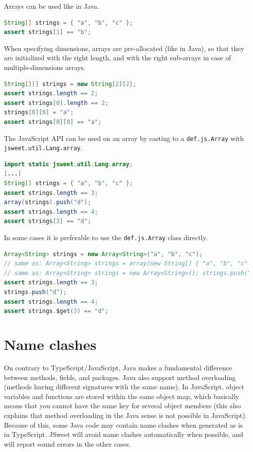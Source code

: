 \documentclass[a4paper]{report}
\begin{document}
Arrays can be used like in Java. 

\begin{lstlisting}[language=Java]
String[] strings = { "a", "b", "c" };
assert strings[1] == "b";
\end{lstlisting}

When specifying dimensions, arrays are pre-allocated (like in Java), so that they are initialized with the right length, and with the right sub-arrays in case of multiple-dimensions arrays.

\begin{lstlisting}[language=Java]
String[][] strings = new String[2][2];
assert strings.length == 2;
assert strings[0].length == 2;
strings[0][0] = "a";
assert strings[0][0] == "a";
\end{lstlisting}

The JavaScript API can be used on an array by casting to a \texttt{def.\-js.\-Array} with \texttt{jsweet.\-util.\-Lang.\-array}.

\begin{lstlisting}[language=Java]
import static jsweet.util.Lang.array;
[...]
String[] strings = { "a", "b", "c" };
assert strings.length == 3;
array(strings).push("d");
assert strings.length == 4;
assert strings[3] == "d";
\end{lstlisting}

In some cases it is preferable to use the \texttt{def.\-js.\-Array} class directly.

\begin{lstlisting}[language=Java]
Array<String> strings = new Array<String>("a", "b", "c");
// same as: Array<String> strings = array(new String[] { "a", "b", "c" });
// same as: Array<String> strings = new Array<String>(); strings.push("a", "b", "c");
assert strings.length == 3;
strings.push("d");
assert strings.length == 4;
assert strings.$get(3) == "d";
\end{lstlisting}

\section{Name clashes}

On contrary to TypeScript/JavaScript, Java makes a fundamental difference between methods, fields, and packages. Java also support method overloading (methods having different signatures with the same name). In JavaScript, object variables and functions are stored within the same object map, which basically means that you cannot have the same key for several object members (this also explains that method overloading in the Java sense is not possible in JavaScript). Because of this, some Java code may contain name clashes when generated as is in TypeScript. JSweet will avoid name clashes automatically when possible, and will report sound errors in the other cases.
\end{document}
